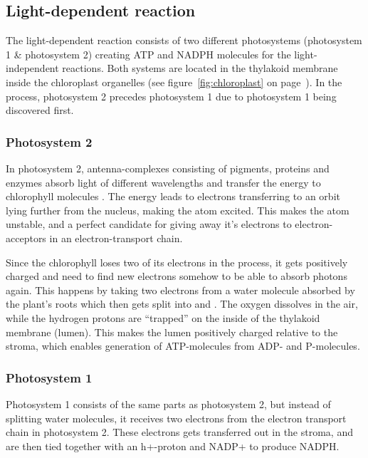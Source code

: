 \subsection{Light-dependent reaction}
The light-dependent reaction consists of two different photosystems (photosystem 1 \& photosystem 2) creating ATP and NADPH molecules for the light-independent reactions. Both systems are located in the thylakoid membrane inside the chloroplast organelles (see figure~\ref{fig:chloroplast} on page~\pageref{fig:chloroplast}).  In the process, photosystem 2 precedes photosystem 1 due to photosystem 1 being discovered first. 

\subsubsection{Photosystem 2}
In photosystem 2, antenna-complexes consisting of pigments, proteins and enzymes absorb light of different wavelengths and transfer the energy to chlorophyll molecules \citep{bios}. The energy leads to electrons transferring to an orbit lying further from the nucleus, making the atom excited. This makes the atom unstable, and a perfect candidate for giving away it’s electrons to electron-acceptors in an electron-transport chain.

Since the chlorophyll loses two of its electrons in the process, it gets positively charged and need to find new electrons somehow to be able to absorb photons again. This happens by taking two electrons from a water molecule absorbed by the plant’s roots which then gets split into  and  \citep{bios}. The oxygen dissolves in the air, while the hydrogen protons are “trapped” on the inside of the thylakoid membrane (lumen). This makes the lumen positively charged relative to the stroma, which enables generation of ATP-molecules from ADP- and P-molecules. 

\subsubsection{Photosystem 1}
Photosystem 1 consists of the same parts as photosystem 2, but instead of splitting water molecules, it receives two electrons from the electron transport chain in photosystem 2. These electrons gets transferred out in the stroma, and are then tied together with an h+-proton and NADP+ to produce NADPH.


